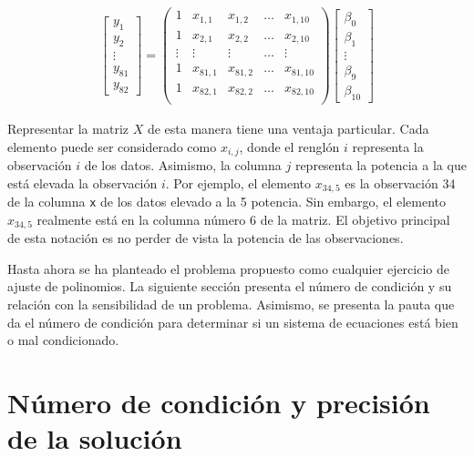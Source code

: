 \begin{equation} \label{eq_matrizX}
    \begin{aligned}
    \begin{bmatrix}
    	y_1 \\
    	y_2 \\
    	\vdots \\
    	y_{81} \\
    	y_{82}
    \end{bmatrix}
    =     
    \begin{pmatrix}
    1 & x_{1,1} & x_{1,2} & \dots & x_{1, 10}  \\
    1 & x_{2,1} & x_{2, 2} & \dots & x_{2, 10} \\
    \vdots & \vdots & \vdots & \dots & \vdots \\
    1 & x_{81,1} & x_{81, 2} & \dots & x_{81, 10} \\
    1 & x_{82,1} & x_{82, 2} & \dots & x_{82, 10} \\
    \end{pmatrix}
	\begin{bmatrix}
		\beta_0 \\
		\beta_1 \\
		\vdots \\
		\beta_9 \\
		\beta_{10}
	\end{bmatrix}
    \end{aligned}
\end{equation} 

Representar la matriz $X$ de esta manera tiene una ventaja particular. Cada elemento puede ser considerado como $x_{i, j}$, donde el renglón $i$ representa la observación $i$ de los datos. Asimismo, la columna $j$ representa la potencia a la que está elevada la observación $i$. Por ejemplo, el elemento $x_{34, 5}$ es la observación 34 de la columna \texttt{x} de los datos elevado a la 5 potencia. Sin embargo, el elemento $x_{34, 5}$ realmente está en la columna número 6 de la matriz. El objetivo principal de esta notación es no perder de vista la potencia de las observaciones. 

Hasta ahora se ha planteado el problema propuesto como cualquier ejercicio de ajuste de polinomios. La siguiente sección presenta el número de condición y su relación con la sensibilidad de un problema. Asimismo, se presenta la pauta que da el número de condición para determinar si un sistema de ecuaciones está bien o mal condicionado.

\section{Número de condición y precisión de la solución}

